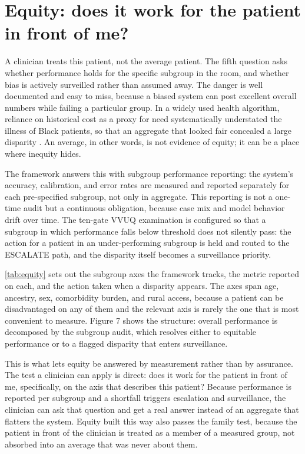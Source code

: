\section{Equity: does it work for the patient in front of me?}
\label{sec:equity}

A clinician treats this patient, not the average patient. The fifth question asks
whether performance holds for the specific subgroup in the room, and whether bias
is actively surveilled rather than assumed away. The danger is well documented and
easy to miss, because a biased system can post excellent overall numbers while
failing a particular group. In a widely used health algorithm, reliance on
historical cost as a proxy for need systematically understated the illness of Black
patients, so that an aggregate that looked fair concealed a large disparity
\cite{obermeyer2019dissecting}. An average, in other words, is not evidence of
equity; it can be a place where inequity hides.

The framework answers this with subgroup performance reporting: the system's
accuracy, calibration, and error rates are measured and reported separately for
each pre-specified subgroup, not only in aggregate. This reporting is not a
one-time audit but a continuous obligation, because case mix and model behavior
drift over time. The ten-gate VVUQ examination is configured so that a subgroup in
which performance falls below threshold does not silently pass: the action for a
patient in an under-performing subgroup is held and routed to the ESCALATE path,
and the disparity itself becomes a surveillance priority.

\autoref{tab:equity} sets out the subgroup axes the framework tracks, the metric
reported on each, and the action taken when a disparity appears. The axes span age,
ancestry, sex, comorbidity burden, and rural access, because a patient can be
disadvantaged on any of them and the relevant axis is rarely the one that is most
convenient to measure. Figure 7 shows the structure: overall performance is
decomposed by the subgroup audit, which resolves either to equitable performance or
to a flagged disparity that enters surveillance.

This is what lets equity be answered by measurement rather than by assurance. The
test a clinician can apply is direct: does it work for the patient in front of me,
specifically, on the axis that describes this patient? Because performance is
reported per subgroup and a shortfall triggers escalation and surveillance, the
clinician can ask that question and get a real answer instead of an aggregate that
flatters the system. Equity built this way also passes the family test, because the
patient in front of the clinician is treated as a member of a measured group, not
absorbed into an average that was never about them.

